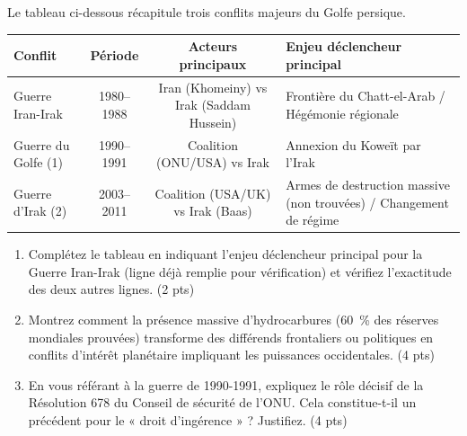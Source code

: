 \documentclass[11pt]{article}
\begin{document}
\begin{exercice}
Le tableau ci-dessous récapitule trois conflits majeurs du Golfe persique.

\begin{tabularx}{\linewidth}{|X|c|c|X|}
\hline
\textbf{Conflit} & \textbf{Période} & \textbf{Acteurs principaux} & \textbf{Enjeu déclencheur principal} \\
\hline
Guerre Iran-Irak & 1980--1988 & Iran (Khomeiny) vs Irak (Saddam Hussein) & Frontière du Chatt-el-Arab / Hégémonie régionale \\
\hline
Guerre du Golfe (1) & 1990--1991 & Coalition (ONU/USA) vs Irak & Annexion du Koweït par l'Irak \\
\hline
Guerre d'Irak (2) & 2003--2011 & Coalition (USA/UK) vs Irak (Baas) & Armes de destruction massive (non trouvées) / Changement de régime \\
\hline
\end{tabularx}

\begin{enumerate}
    \item Complétez le tableau en indiquant l'enjeu déclencheur principal pour la Guerre Iran-Irak (ligne déjà remplie pour vérification) et vérifiez l'exactitude des deux autres lignes. (2 pts)
    \item Montrez comment la présence massive d'hydrocarbures (\SI{60}{\%} des réserves mondiales prouvées) transforme des différends frontaliers ou politiques en conflits d'intérêt planétaire impliquant les puissances occidentales. (4 pts)
    \item En vous référant à la guerre de 1990-1991, expliquez le rôle décisif de la Résolution 678 du Conseil de sécurité de l'ONU. Cela constitue-t-il un précédent pour le « droit d'ingérence » ? Justifiez. (4 pts)
\end{enumerate}
\end{exercice}
\end{document}
